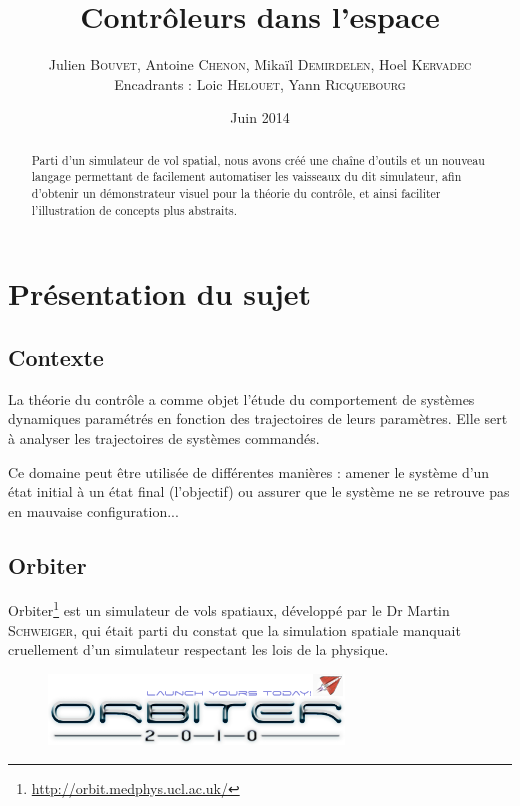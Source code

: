 \documentclass[a4paper,11pt]{article}
\title{\textbf{Contrôleurs dans l'espace}}
\author{Julien \textsc{Bouvet}, Antoine \textsc{Chenon}, Mikaïl \textsc{Demirdelen}, Hoel \textsc{Kervadec}
        \\
        Encadrants : Loic \textsc{Helouet}, Yann \textsc{Ricquebourg}}
\date{Juin 2014}
\begin{document}
\thispagestyle{empty}

\maketitle
\begin{abstract}
    Parti d'un simulateur de vol spatial, nous avons créé une chaîne d'outils et un nouveau langage permettant de facilement automatiser les vaisseaux du dit simulateur, afin d'obtenir un démonstrateur visuel pour la théorie du contrôle, et ainsi faciliter l'illustration de concepts plus abstraits.
\end{abstract}



\section{Présentation du sujet}
    \subsection{Contexte}
        La théorie du contrôle a comme objet l'étude du comportement de systèmes dynamiques paramétrés en fonction des trajectoires de leurs paramètres. Elle sert à analyser les trajectoires de systèmes commandés.

        Ce domaine peut être utilisée de différentes manières : amener le système d'un état initial à un état final (l'objectif) ou assurer que le système ne se retrouve pas en mauvaise configuration...

    \subsection{Orbiter}
        Orbiter\footnote{\url{http://orbit.medphys.ucl.ac.uk/}} est un simulateur de vols spatiaux, développé par le Dr Martin \textsc{Schweiger}, qui était parti du constat que la simulation spatiale manquait cruellement d'un simulateur respectant les lois de la physique.

        \begin{figure}[!h]
            \begin{center}
                \includegraphics[width=0.7\textwidth]{img/orbiter_logo.png}
            \end{center}
        \end{figure}
\end{document}
